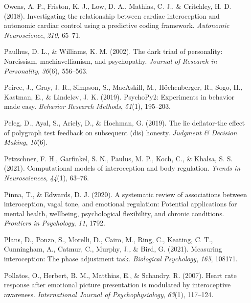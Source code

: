 \documentclass[
  man,mask,floatsintext]{apa6}
\newlength{\cslhangindent}
\newlength{\cslentryspacingunit} %
\newenvironment{CSLReferences}[2] %
 {%
  \setlength{\parindent}{0pt}
  \ifodd #1
  \let\oldpar\par
  \def\par{\hangindent=\cslhangindent\oldpar}
  \fi
  \setlength{\parskip}{#2\cslentryspacingunit}
 }%
 {}
\begin{document}
\begin{CSLReferences}{1}{0}
\leavevmode{}%
Owens, A. P., Friston, K. J., Low, D. A., Mathias, C. J., \& Critchley, H. D. (2018). Investigating the relationship between cardiac interoception and autonomic cardiac control using a predictive coding framework. \emph{Autonomic Neuroscience}, \emph{210}, 65--71.

\leavevmode{}%
Paulhus, D. L., \& Williams, K. M. (2002). The dark triad of personality: Narcissism, machiavellianism, and psychopathy. \emph{Journal of Research in Personality}, \emph{36}(6), 556--563.

\leavevmode{}%
Peirce, J., Gray, J. R., Simpson, S., MacAskill, M., Höchenberger, R., Sogo, H., Kastman, E., \& Lindeløv, J. K. (2019). PsychoPy2: Experiments in behavior made easy. \emph{Behavior Research Methods}, \emph{51}(1), 195--203.

\leavevmode{}%
Peleg, D., Ayal, S., Ariely, D., \& Hochman, G. (2019). The lie deflator-the effect of polygraph test feedback on subsequent (dis) honesty. \emph{Judgment \& Decision Making}, \emph{16}(6).

\leavevmode{}%
Petzschner, F. H., Garfinkel, S. N., Paulus, M. P., Koch, C., \& Khalsa, S. S. (2021). Computational models of interoception and body regulation. \emph{Trends in Neurosciences}, \emph{44}(1), 63--76.

\leavevmode{}%
Pinna, T., \& Edwards, D. J. (2020). A systematic review of associations between interoception, vagal tone, and emotional regulation: Potential applications for mental health, wellbeing, psychological flexibility, and chronic conditions. \emph{Frontiers in Psychology}, \emph{11}, 1792.

\leavevmode{}%
Plans, D., Ponzo, S., Morelli, D., Cairo, M., Ring, C., Keating, C. T., Cunningham, A., Catmur, C., Murphy, J., \& Bird, G. (2021). Measuring interoception: The phase adjustment task. \emph{Biological Psychology}, \emph{165}, 108171.

\leavevmode{}%
Pollatos, O., Herbert, B. M., Matthias, E., \& Schandry, R. (2007). Heart rate response after emotional picture presentation is modulated by interoceptive awareness. \emph{International Journal of Psychophysiology}, \emph{63}(1), 117--124.


\end{CSLReferences}
\end{document}
